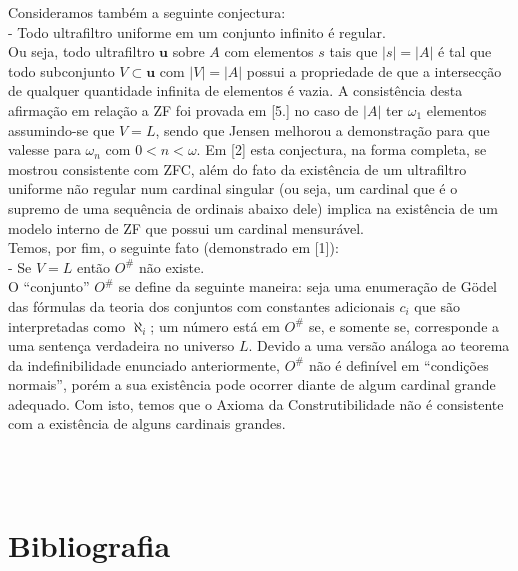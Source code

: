 \documentclass[11pt,a4paper]{article}
\theoremstyle{definition}
\begin{document}
Consideramos também a seguinte conjectura: \\

- Todo ultrafiltro uniforme em um conjunto infinito é regular. \\

Ou seja, todo ultrafiltro $\textbf{u}$ sobre $A$ com elementos $s$ tais que $|s|=|A|$ é tal que todo subconjunto $V\subset \textbf{u}$ com $|V|=|A|$ possui a propriedade de que a intersecção de qualquer quantidade infinita de elementos é vazia. A consistência desta afirmação em relação a ZF foi provada em [5.] no caso de $|A|$ ter $\omega_1$ elementos assumindo-se que $V=L$, sendo que Jensen melhorou a demonstração para que valesse para $\omega_n$ com $0<n<\omega$. Em [2] esta conjectura, na forma completa, se mostrou consistente com ZFC, além do fato da existência de um ultrafiltro uniforme não regular num cardinal singular (ou seja, um cardinal que é o supremo de uma sequência de ordinais abaixo dele) implica na existência de um modelo interno de ZF que possui um cardinal mensurável. \\ 

Temos, por fim, o seguinte fato (demonstrado em [1]): \\

- Se $V=L$ então $O^{\#}$ não existe. \\

O ``conjunto'' $O^{\#}$ se define da seguinte maneira: seja uma enumeração de Gödel das fórmulas da teoria dos conjuntos com constantes adicionais $c_i$ que são interpretadas como $\aleph_i$; um número está em $O^{\#}$ se, e somente se, corresponde a uma sentença verdadeira no universo $L$. Devido a uma versão análoga ao teorema da indefinibilidade enunciado anteriormente,  $O^{\#}$ não é definível em ``condições normais'', porém a sua existência pode ocorrer diante de algum cardinal grande adequado. Com isto, temos que o Axioma da Construtibilidade não é consistente com a existência de alguns cardinais grandes. 







\ \\
\ \\

\section{Bibliografia}

\ \\
\end{document}
